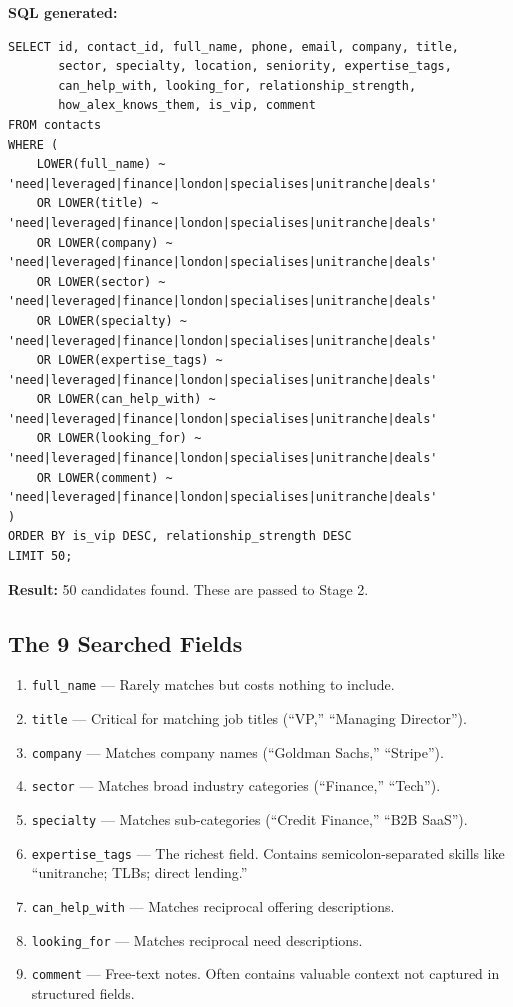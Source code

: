 \documentclass[12pt, a4paper]{report}
\begin{document}
\textbf{SQL generated:}
\begin{lstlisting}[style=sqlstyle]
SELECT id, contact_id, full_name, phone, email, company, title,
       sector, specialty, location, seniority, expertise_tags,
       can_help_with, looking_for, relationship_strength,
       how_alex_knows_them, is_vip, comment
FROM contacts
WHERE (
    LOWER(full_name) ~ 'need|leveraged|finance|london|specialises|unitranche|deals'
    OR LOWER(title) ~ 'need|leveraged|finance|london|specialises|unitranche|deals'
    OR LOWER(company) ~ 'need|leveraged|finance|london|specialises|unitranche|deals'
    OR LOWER(sector) ~ 'need|leveraged|finance|london|specialises|unitranche|deals'
    OR LOWER(specialty) ~ 'need|leveraged|finance|london|specialises|unitranche|deals'
    OR LOWER(expertise_tags) ~ 'need|leveraged|finance|london|specialises|unitranche|deals'
    OR LOWER(can_help_with) ~ 'need|leveraged|finance|london|specialises|unitranche|deals'
    OR LOWER(looking_for) ~ 'need|leveraged|finance|london|specialises|unitranche|deals'
    OR LOWER(comment) ~ 'need|leveraged|finance|london|specialises|unitranche|deals'
)
ORDER BY is_vip DESC, relationship_strength DESC
LIMIT 50;
\end{lstlisting}

\textbf{Result:} 50 candidates found. These are passed to Stage 2.

\subsection{The 9 Searched Fields}

\begin{enumerate}[itemsep=2pt]
    \item \texttt{full\_name} --- Rarely matches but costs nothing to include.
    \item \texttt{title} --- Critical for matching job titles (``VP,'' ``Managing Director'').
    \item \texttt{company} --- Matches company names (``Goldman Sachs,'' ``Stripe'').
    \item \texttt{sector} --- Matches broad industry categories (``Finance,'' ``Tech'').
    \item \texttt{specialty} --- Matches sub-categories (``Credit Finance,'' ``B2B SaaS'').
    \item \texttt{expertise\_tags} --- The richest field. Contains semicolon-separated skills like ``unitranche; TLBs; direct lending.''
    \item \texttt{can\_help\_with} --- Matches reciprocal offering descriptions.
    \item \texttt{looking\_for} --- Matches reciprocal need descriptions.
    \item \texttt{comment} --- Free-text notes. Often contains valuable context not captured in structured fields.
\end{enumerate}
\end{document}
